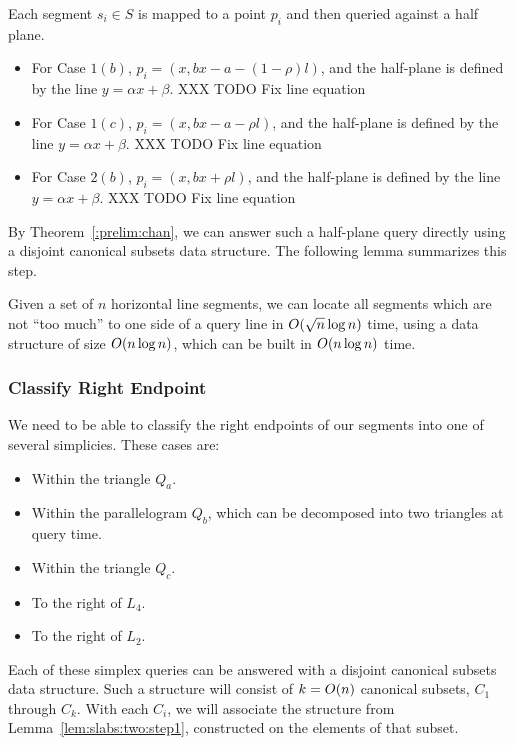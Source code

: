 Each segment $s_i \in S$ is mapped to a point $p_i$ and then queried against a half plane.
\begin{itemize}
  \item For Case $1(b)$, $p_i = (x, bx - a - (1 - \rho)l)$, and the half-plane is defined by the line $y = \alpha x + \beta$. XXX TODO Fix line equation
  
  \item For Case $1(c)$, $p_i = (x, bx - a - \rho l)$, and the half-plane is defined by the line $y = \alpha x + \beta$. XXX TODO Fix line equation

  \item For Case $2(b)$, $p_i = (x, bx + \rho l)$, and the half-plane is defined by the line $y = \alpha x + \beta$. XXX TODO Fix line equation
\end{itemize}

By Theorem~\ref{:prelim:chan}, we can answer such a half-plane query directly using a disjoint canonical subsets data structure.  The following lemma summarizes this step.

\begin{lemma}
\label{lem:slabs:two:step1}
Given a set of $n$ horizontal line segments, we can locate all segments which are not ``too much'' to one side of a query line in $O\!\left(\sqrt{n}\log{n}\right)$ time, using a data structure of size $O\!\left(n\log{n}\right)$, which can be built in $O\!\left(n\log{n}\right)$ time.
\end{lemma}


\subsubsection{Classify Right Endpoint}

We need to be able to classify the right endpoints of our segments into one of several simplicies. These cases are:
\begin{itemize}
 \item Within the triangle $Q_a$.
 \item Within the parallelogram $Q_b$, which can be decomposed into two triangles at query time.
 \item Within the triangle $Q_c$.
 \item To the right of $L_4$.
 \item To the right of $L_2$.
\end{itemize}

Each of these simplex queries can be answered with a disjoint canonical subsets data structure. Such a structure will consist of $k = O\!\left(n\right)$ canonical subsets, $C_1$ through $C_k$. With each $C_i$, we will associate the structure from Lemma~\ref{lem:slabs:two:step1}, constructed on the elements of that subset.

